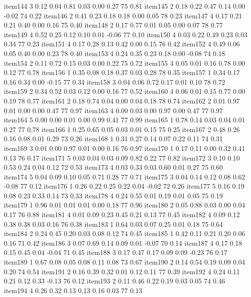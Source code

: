 \documentclass[10pt,man]{apa6}\usepackage{graphicx, color}
\begin{document}
\begin{Schunk}
\begin{Soutput}
item144   3 0.12 0.04 0.81 0.03 0.00  0.27 75 0.81
item145   2 0.18 0.22 0.47 0.14 0.00 -0.02 74 0.22
item146   2 0.41 0.23 0.18 0.18 0.00  0.05 78 0.23
item147   4 0.17 0.21 0.21 0.40 0.00  0.16 75 0.40
item148   2 0.17 0.77 0.01 0.05 0.00  0.07 78 0.77
item149   4 0.52 0.25 0.12 0.10 0.01 -0.06 77 0.10
item150   4 0.03 0.22 0.49 0.23 0.03  0.34 77 0.23
item151   4 0.17 0.28 0.13 0.42 0.00  0.15 76 0.42
item152   4 0.49 0.06 0.05 0.40 0.00  0.23 78 0.40
item153   4 0.24 0.35 0.23 0.18 0.00 -0.08 74 0.18
item154   2 0.11 0.72 0.15 0.03 0.00  0.22 75 0.72
item155   4 0.05 0.01 0.16 0.78 0.00  0.12 77 0.78
item156   1 0.35 0.08 0.18 0.37 0.03  0.28 78 0.35
item157   1 0.34 0.17 0.16 0.34 0.00 -0.15 77 0.34
item158   3 0.04 0.06 0.72 0.17 0.01  0.10 78 0.72
item159   2 0.34 0.52 0.03 0.12 0.00  0.16 77 0.52
item160   4 0.06 0.01 0.15 0.77 0.00  0.19 78 0.77
item161   2 0.18 0.74 0.04 0.00 0.04  0.18 78 0.74
item162   2 0.01 0.97 0.01 0.00 0.00  0.47 77 0.97
item163   4 0.00 0.03 0.00 0.97 0.00  0.47 77 0.97
item164   5 0.00 0.00 0.01 0.00 0.99  0.41 77 0.99
item165   1 0.78 0.14 0.03 0.04 0.01  0.27 77 0.78
item166   1 0.25 0.65 0.05 0.03 0.01  0.15 75 0.25
item167   2 0.48 0.26 0.16 0.08 0.01  0.29 73 0.26
item168   1 0.31 0.27 0.14 0.07 0.22  0.11 74 0.31
item169   3 0.01 0.00 0.97 0.01 0.00  0.16 76 0.97
item170   1 0.17 0.11 0.00 0.32 0.41  0.13 76 0.17
item171   5 0.03 0.04 0.03 0.09 0.82  0.22 77 0.82
item172   3 0.10 0.10 0.53 0.24 0.04  0.12 72 0.53
item173   4 0.03 0.33 0.03 0.60 0.01  0.27 75 0.60
item174   5 0.04 0.09 0.10 0.05 0.71  0.28 77 0.71
item175   3 0.04 0.14 0.12 0.08 0.62 -0.08 77 0.12
item176   1 0.26 0.22 0.25 0.22 0.04 -0.02 72 0.26
item177   5 0.16 0.19 0.08 0.23 0.33  0.14 73 0.33
item178   4 0.24 0.55 0.01 0.19 0.01  0.05 75 0.19
item179   1 0.96 0.01 0.01 0.01 0.00  0.18 77 0.96
item180   2 0.05 0.88 0.03 0.00 0.04  0.17 76 0.88
item181   4 0.01 0.09 0.23 0.45 0.21  0.13 77 0.45
item182   4 0.09 0.12 0.38 0.38 0.03  0.16 76 0.38
item183   1 0.64 0.03 0.07 0.25 0.01  0.18 75 0.64
item184   2 0.24 0.45 0.20 0.03 0.08  0.12 74 0.45
item185   1 0.42 0.11 0.21 0.20 0.06  0.16 71 0.42
item186   3 0.07 0.69 0.14 0.09 0.01 -0.07 70 0.14
item187   4 0.17 0.18 0.15 0.45 0.04 -0.04 71 0.45
item188   3 0.17 0.47 0.17 0.09 0.09 -0.23 76 0.17
item189   1 0.67 0.08 0.05 0.08 0.11  0.08 73 0.67
item190   2 0.14 0.54 0.19 0.09 0.04  0.20 74 0.54
item191   2 0.16 0.39 0.32 0.01 0.12  0.11 77 0.39
item192   4 0.24 0.11 0.21 0.12 0.33 -0.13 76 0.12
item193   2 0.11 0.46 0.22 0.19 0.03  0.05 74 0.46
item194   4 0.26 0.32 0.13 0.13 0.16  0.03 77 0.13

\end{Soutput}
\end{Schunk}
\end{document}
